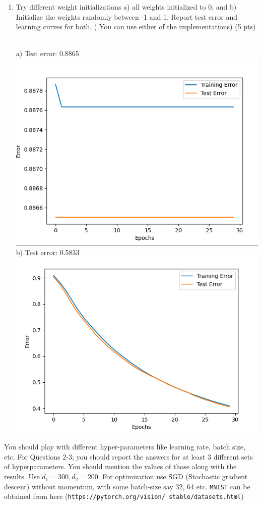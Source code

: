 \documentclass[a4paper]{article}
\theoremstyle{definition}
\newenvironment{soln}{
    \leavevmode\color{blue}\ignorespaces
}{}
\begin{document}
\begin{enumerate}
\begin{soln}
\begin{center}
 \end{center}
    \end{soln}
    \item Try different weight initializations a) all weights initialized to 0, and b) Initialize the weights randomly between -1 and 1. Report test error and learning curves for both. ( You can use either of the implementations) (5 pts)
    \begin{soln}
   \\ a) Test error: 0.8865\\
     \includegraphics[scale=0.4]{w=0}\\
     b) Test error: 0.5833\\
     \includegraphics[scale=0.4]{w=-1..1}\\
    \end{soln}
\end{enumerate}
You should play with different hyper-parameters like learning rate, batch size, etc. For Questions 2-3; you should report the answers for at least 3 different sets of hyperparameters. You should mention the values of those along with the results. Use $d_1 = 300, d_2 = 200$. For optimization use SGD (Stochastic gradient descent) without momentum, with some batch-size say 32, 64 etc. {\tt MNIST} can be obtained from here ({\tt https://{\tt pytorch}.org/vision/ stable/datasets.html}) 
\end{document}
